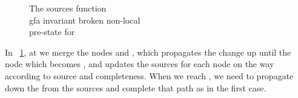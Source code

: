 \begin{figure}[H]

\caption{
The sources function\\
gfa invariant broken non-local\\
pre-state for 
}
\label{snippet3.16a_graph9}
\end{figure}
In ~\ref{snippet3.16a_graph9}, at  we merge the nodes  and , which propagates the change up until the node  which becomes , and updates the sources for each node on the way according to source and \GFA{} completeness. 
When we reach , we need to propagate down the \GFA{}  from the sources and complete that path as in the first case.

